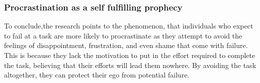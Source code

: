 \subsubsection{Procrastination as a self fulfilling prophecy}
To conclude,the research points to the phenomenon, that individuals who expect to fail at a task are more
likely to procrastinate as they attempt to avoid the feelings of disappointment,
frustration, and even shame that come with failure.
This is because they lack the motivation to put in the effort required to complete the task,
believing that their efforts will lead them nowhere.
By avoiding the task altogether, they can protect their ego from potential failure.